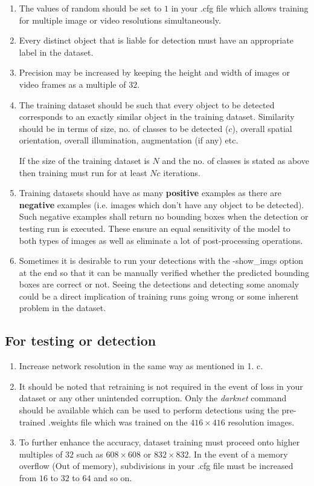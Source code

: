 \begin{enumerate}
  \item The values of {\selectfont random} should be set to $1$ in your  {\selectfont .cfg} file which allows training for multiple image or video resolutions simultaneously.
  \item Every distinct object that is liable for detection must have an appropriate label in the dataset.
  \item Precision may be increased by keeping the height and width of images or video frames as a multiple of $32$.
  \item The training dataset should be such that every object to be detected corresponds to an exactly similar object in the training dataset. Similarity should be in terms of size, no. of classes to be detected ($c$), overall spatial orientation, overall illumination, augmentation (if any) etc. \par

  If the size of the training dataset is $N$ and the no. of classes is stated as above then training must run for at least $Nc$ iterations.
  \item Training datasets should have as many \textbf{positive} examples as there are \textbf{negative} examples (i.e. images which don’t have any object to be detected). Such negative examples shall return no bounding boxes when the detection or testing run is executed. These ensure an equal sensitivity of the model to both types of images as well as eliminate a lot of post-processing operations.
  \item Sometimes it is desirable to run your detections with the {\selectfont -show\_imgs} option at the end so that it can be manually verified whether the predicted bounding boxes are correct or not. Seeing the detections and detecting some anomaly could be a direct implication of training runs going wrong or some inherent problem in the dataset.
\end{enumerate}


\subsection{For testing or detection}

\begin{enumerate}
  \item Increase network resolution in the same way as mentioned in 1. c.
  \item It should be noted that retraining is not required in the event of loss in your dataset or any other unintended corruption. Only the \textit{darknet} command should be available which can be used to perform detections using the pre-trained {\selectfont .weights} file which was trained on the $416 \times 416$ resolution images.
  \item To further enhance the accuracy, dataset training must proceed onto higher multiples of  $32$ such as $608 \times 608$ or $832 \times 832$. In the event of a memory overflow ({\selectfont Out of memory}), {\selectfont subdivisions} in your {\selectfont .cfg} file must be increased from $16$ to $32$ to $64$ and so on.
\end{enumerate}
